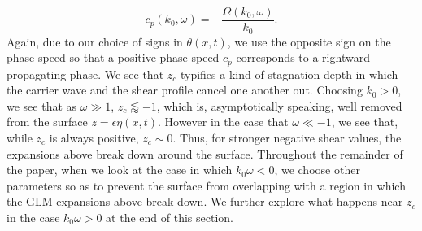 \documentclass{JFM_Style/jfm}
\begin{document}
\[
c_{p}(k_{0},\omega) = -\frac{\Omega(k_{0},\omega)}{k_{0}}.
\]
Again, due to our choice of signs in $\theta(x,t)$, we use the opposite sign on the phase speed so that a positive phase speed $c_{p}$ corresponds to a rightward propagating phase.   We see that $z_{c}$ typifies a kind of stagnation depth in which the carrier wave and the shear profile cancel one another out.  Choosing $k_{0}>0$, we see that as $\omega \gg 1$, $z_{c}\lessapprox -1$, which is, asymptotically speaking, well removed from the surface $z=\epsilon \eta(x,t)$.  However in the case that $\omega \ll -1$, we see that, while $z_{c}$ is always positive, $z_{c}\sim 0$.  Thus, for stronger negative shear values, the expansions above break down around the surface.    Throughout the remainder of the paper, when we look at the case in which $k_{0}\omega <0$, we choose other parameters so as to prevent the surface from overlapping with a region in which the GLM expansions above break down. We further explore what happens near $z_{c}$ in the case $k_{0}\omega >0$ at the end of this section.
\end{document}

